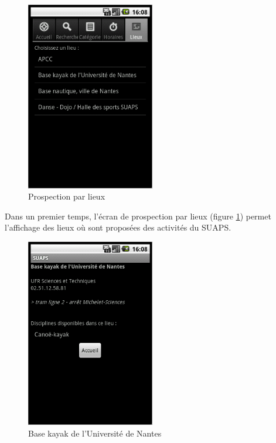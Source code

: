 \documentclass{article}
\begin{document}
	\begin{figure}[ht]
		\centering
		\includegraphics[width=0.5\textwidth]{lieux.png}
		\caption{Prospection par lieux}
		\label{fig:lieux}
	\end{figure}

	Dans un premier temps, l'écran de prospection par lieux (figure
	\ref{fig:lieux}) permet l'affichage des lieux où sont proposées des
	activités du SUAPS.

	\begin{figure}[ht]
		\centering
		\includegraphics[width=0.5\textwidth]{basekayak.png}
		\caption{Base kayak de l'Université de Nantes}
		\label{fig:basekayak}
	\end{figure}
\end{document}
